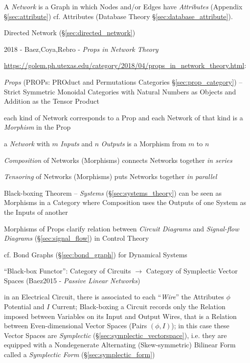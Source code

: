 A \emph{Network} is a Graph in which Nodes and/or Edges have \emph{Attributes}
(Appendix \S\ref{sec:attribute}) \fist cf. Attributes (Database Theory
\S\ref{sec:database_attribute}).

\fist Directed Network (\S\ref{sec:directed_network})

\asterism

2018 - Baez,Coya,Rebro - \emph{Props in Network Theory}

\url{https://golem.ph.utexas.edu/category/2018/04/props_in_network_theory.html}:

\emph{Props} (PROPs: PROduct and Permutations Categories
\S\ref{sec:prop_category}) -- Strict Symmetric Monoidal Categories with Natural
Numbers as Objects and Addition as the Tensor Product

each kind of Network corresponds to a Prop and each Network of
that kind is a \emph{Morphism} in the Prop

a \emph{Network} with $m$ \emph{Inputs} and $n$ \emph{Outputs} is a Morphism
from $m$ to $n$

\emph{Composition} of Networks (Morphisms) connects Networks together \emph{in
  series}

\emph{Tensoring} of Networks (Morphisms) puts Networks together \emph{in
  parallel}

Black-boxing Theorem -- \emph{Systems} (\S\ref{sec:systems_theory}) can be seen
as Morphisms in a Category where Composition uses the Outputs of one System as
the Inputs of another

Morphisms of Props clarify relation between \emph{Circuit Diagrams} and
\emph{Signal-flow Diagrams} (\S\ref{sec:signal_flow}) in Control Theory

cf. Bond Graphs (\S\ref{sec:bond_graph}) for Dynamical Systems

``Black-box Functor'': Category of Circuits $\rightarrow$ Category of
Symplectic Vector Spaces (Baez2015 - \emph{Passive Linear Networks})

in an Electrical Circuit, there is associated to each ``\emph{Wire}'' the
Attributes $\phi$ Potential and $I$ Current; Black-boxing a Circuit records
only the Relation imposed between Variables on its Input and Output Wires, that
is a Relation between Even-dimensional Vector Spaces (Pairs $(\phi,I)$); in
this case these Vector Spaces are \emph{Symplectic}
(\S\ref{sec:symplectic_vectorspace}), i.e. they are equipped with a
Nondegenerate Alternating (Skew-symmetric) Bilinear Form
called a \emph{Symplectic Form} (\S\ref{sec:symplectic_form})

